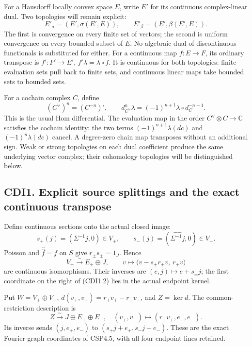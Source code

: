 For a Hausdorff locally convex space \(E\), write \(E'\) for its
continuous complex-linear dual. Two topologies will remain explicit: \[
E'_\sigma=(E',\sigma(E',E)),\qquad
E'_\beta=(E',\beta(E',E)).
\tag{CDI0.3}
\] The first is convergence on every finite set of vectors; the second
is uniform convergence on every bounded subset of \(E\). No algebraic
dual of discontinuous functionals is substituted for either. For a
continuous map \(f:E\to F\), its ordinary transpose is \(f':F'\to E'\),
\(f'\lambda=\lambda\circ f\). It is continuous for both topologies:
finite evaluation sets pull back to finite sets, and continuous linear
maps take bounded sets to bounded sets.

For a cochain complex \(C\), define \[
(C^\vee)^n=(C^{-n})',\qquad
d_{C^\vee}^n\lambda=(-1)^{n+1}\lambda\circ d_C^{-n-1}.
\tag{CDI0.4}
\] This is the usual Hom differential. The evaluation map in the order
\(C^\vee\otimes C\to\mathbb C\) satisfies the cochain identity: the two
terms \((-1)^{n+1}\lambda(dc)\) and \((-1)^n\lambda(dc)\) cancel. A
degree-zero chain map transposes without an additional sign. Weak or
strong topologies on each dual coefficient produce the same underlying
vector complex; their cohomology topologies will be distinguished below.

\subsection{CDI1. Explicit source splittings and the exact continuous
transpose}\label{cdi1.-explicit-source-splittings-and-the-exact-continuous-transpose}

Define continuous sections onto the actual closed image: \[
s_+(j)=(\Sigma^{-1}j,0)\in V_+,
\qquad
s_-(j)=(\widehat{\Sigma^{-1}j},0)\in V_-.
\tag{CDI1.1}
\] Poisson and \(\widehat{\widehat f}=f\) on \(S\) give
\(r_\pm s_\pm=1_J\). Hence \[
V_\pm\xrightarrow{\sim}E_\pm\oplus J,
\qquad v\longmapsto\bigl(v-s_\pm r_\pm v,\ r_\pm v\bigr)
\tag{CDI1.2}
\] are continuous isomorphisms. Their inverses are
\((e,j)\mapsto e+s_\pm j\); the first coordinate on the right of
(CDI1.2) lies in the actual endpoint kernel.

Put \(W=V_+\oplus V_-\), \(d(v_+,v_-)=r_+v_+-r_-v_-\), and \(Z=\ker d\).
The common-restriction description is \[
Z\xrightarrow{\sim}J\oplus E_+\oplus E_-,
\quad (v_+,v_-)\longmapsto(r_+v_+,e_+,e_-).
\tag{CDI1.3}
\] Its inverse sends \((j,e_+,e_-)\) to \((s_+j+e_+,s_-j+e_-)\). These
are the exact Fourier-graph coordinates of CSP4.5, with all four
endpoint lines retained.

